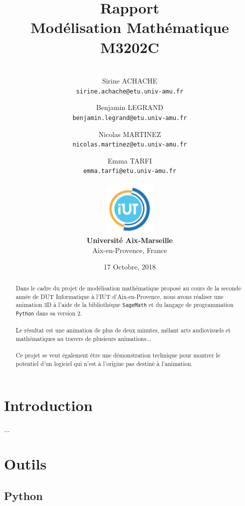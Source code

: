 \documentclass[]{article}
\title{
	Rapport\\
	\textbf{Modélisation Mathématique}\\
	M3202C
}
\date{17 Octobre, 2018}
\author{
	\vspace*{0.3in}\\
	Sirine ACHACHE\\
	\texttt{sirine.achache@etu.univ-amu.fr}
	\and
	Benjamin LEGRAND\\
	\texttt{benjamin.legrand@etu.univ-amu.fr}
	\and
	Nicolas MARTINEZ\\
	\texttt{nicolas.martinez@etu.univ-amu.fr}
	\and
	Emma TARFI\\
	\texttt{emma.tarfi@etu.univ-amu.fr}
	\\
	\vspace*{0.5in}\\
	\includegraphics[width=1in]{iut.png} \\
	\textbf{Université Aix-Marseille}\\
	Aix-en-Provence, France
}
\begin{document}

\maketitle
\newpage


\renewcommand{\contentsname}{Sommaire}
\tableofcontents
\newpage

\begin{abstract}
	Dans le cadre du projet de modélisation mathématique proposé au cours de la seconde année de DUT Informatique à l'IUT d'Aix-en-Provence, nous avons réaliser une animation 3D à l'aide de la bibliothèque \texttt{SageMath} et du langage de programmation \texttt{Python} dans sa version 2.\\
	\\
	Le résultat est une animation de plus de deux minutes, mêlant arts audiovisuels et mathématiques au travers de plusieurs animations...\\
	\\
	Ce projet se veut également être une démonstration technique pour montrer le potentiel d'un logiciel qui n'est à l'origine pas destiné à l'animation.
\end{abstract}

\newpage

\section{Introduction}

...

\newpage

\section{Outils}

\subsection{Python}
\end{document}
